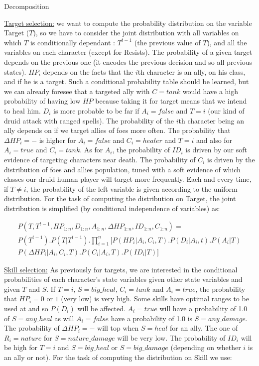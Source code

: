 \begin{center}
Decomposition
\end{center}

\underline{Target selection:} we want to compute the probability distribution on the variable Target ($T$), so we have to consider the joint distribution with all variables on which $T$ is conditionally dependant : $T^{t-1}$ (the previous value of $T$), and all the variables on each character (except for Resists). The probability of a given target depends on the previous one (it encodes the previous decision and so all previous states). $HP_i$ depends on the facts that the $i$th character is an ally, on his class, and if he is a target. Such a conditional probability table should be learned, but we can already foresee that a targeted ally with $C=tank$ would have a high probability of having low $HP$ because taking it for target means that we intend to heal him. $D_i$ is more probable to be far if $A_i=false$ and $T=i$ (our kind of druid attack with ranged spells). The probability of the $i$th character being an ally depends on if we target allies of foes more often. The probability that $\Delta HP_i=-$ is higher for $A_i=false$ and $C_i=healer$ and $T=i$ and also for $A_i=true$ and $C_i=tank$. As for $A_i$, the probability of $ID_i$ is driven by our soft evidence of targeting characters near death. The probability of $C_i$ is driven by the distribution of foes and allies population, tuned with a soft evidence of which classes our druid human player will target more frequently. Each and every time, if $T \neq i$, the probability of the left variable is given according to the uniform distribution. For the task of computing the distribution on Target, the joint distribution is simplified (by conditional independence of variables) as:

\begin{eqnarray*}
P(T, T^{t-1}, HP_{1:n}, D_{1:n}, A_{1:n}, \Delta HP_{1:n}, ID_{1:n}, C_{1:n}) = \\
P(T^{t-1}).P(T|T^{t-1}).\prod_{i=1}^n [ P(HP_i | A_i, C_i, T).P(D_i | A_i, t).P(A_i | T)\\
P(\Delta HP_i | A_i, C_i, T).P(C_i | A_i, T).P(ID_i | T) ]
\end{eqnarray*}

\underline{Skill selection:} As previously for targets, we are interested in the conditional probabilities of each character's state variables given other state variables and given $T$ and $S$. If $T=i$, $S=big\_heal$, $C_i=tank$ and $A_i=true$, the probability that $HP_i=0$ or $1$ (very low) is very high. Some skills have optimal ranges to be used at and so $P(D_i)$ will be affected. $A_i=true$ will have a probability of 1.0 of $S=any\_heal$ as will $A_i=false$ have a probability of 1.0 is $S=any\_damage$. The probability of $\Delta HP_i=-$ will top when $S=heal$ for an ally. The one of $R_i=nature$ for $S=nature\_damage$ will be very low. The probability of $ID_i$ will be high for $T=i$ and $S=big\_heal$ or $S=big\_damage$ (depending on whether $i$ is an ally or not). For the task of computing the distribution on Skill we use:

